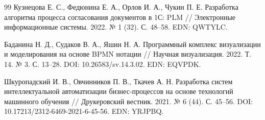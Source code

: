 
\begin{thebibliography}{99}
  Кузнецова Е. С., Федюнина Е. А., Орлов И. А., Чукин П. Е. Разработка алгоритма процесса согласования документов в 1С: PLM // Электронные информационные системы. 2022. № 1 (32). С. 48–58. EDN: QWTYLC.

  Баданина Н. Д., Судаков В. А., Яшин Н. А. Программный комплекс визуализации и моделирования на основе BPMN нотации // Научная визуализация. 2022. Т. 14. № 3. С. 13–28. DOI: 10.26583/sv.14.3.02. EDN: EQVPDK.

  Шкуропадский И. В., Овчинников П. В., Ткачев А. Н. Разработка систем интеллектуальной автоматизации бизнес-процессов на основе технологий машинного обучения // Друкеровский вестник. 2021. № 6 (44). С. 45–56. DOI: 10.17213/2312-6469-2021-6-45-56. EDN: YRJPBQ.
\end{thebibliography}

